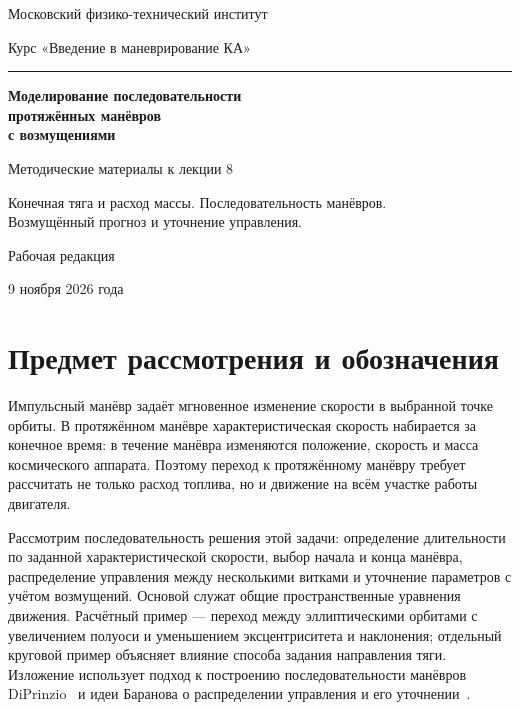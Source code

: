 \documentclass[a4paper,11pt]{article}
\numberwithin{equation}{section}
\begin{document}
\begin{titlepage}
\centering
{\large Московский физико-технический институт\par}
\vspace{8mm}
{\large Курс «Введение в маневрирование КА»\par}
\vspace{27mm}
{\color{accent}\rule{28mm}{.8pt}\par}
\vspace{9mm}
{\LARGE\bfseries Моделирование последовательности\\[3mm]
протяжённых манёвров\\[3mm]
с возмущениями\par}
\vspace{11mm}
{\large Методические материалы к лекции 8\par}
\vspace{8mm}
{Конечная тяга и расход массы. Последовательность манёвров.\\
Возмущённый прогноз и уточнение управления.\par}
\vfill
{Рабочая редакция\par}
\vspace{3mm}
{9 ноября 2026 года\par}
\end{titlepage}
\setcounter{page}{2}
\begingroup\small
\setlength{\parskip}{0pt}
\tableofcontents
\endgroup
\clearpage

\section*{Предмет рассмотрения и обозначения}

Импульсный манёвр задаёт мгновенное изменение скорости в выбранной
точке орбиты. В протяжённом манёвре характеристическая скорость
набирается за конечное время: в течение манёвра изменяются положение,
скорость и масса космического аппарата. Поэтому переход к протяжённому
манёвру требует рассчитать не только расход топлива, но и движение
на всём участке работы двигателя.

Рассмотрим последовательность решения этой задачи: определение
длительности по заданной характеристической скорости, выбор начала
и конца манёвра, распределение управления между несколькими витками
и уточнение параметров с учётом возмущений. Основой служат общие
пространственные уравнения движения. Расчётный пример --- переход между эллиптическими орбитами
с увеличением полуоси и уменьшением эксцентриситета и наклонения;
отдельный круговой пример объясняет влияние способа задания направления тяги.
Изложение использует подход к построению последовательности
манёвров DiPrinzio~\cite{diprinzio} и идеи Баранова о распределении
управления и его уточнении~\cite{baranov}.
\end{document}
